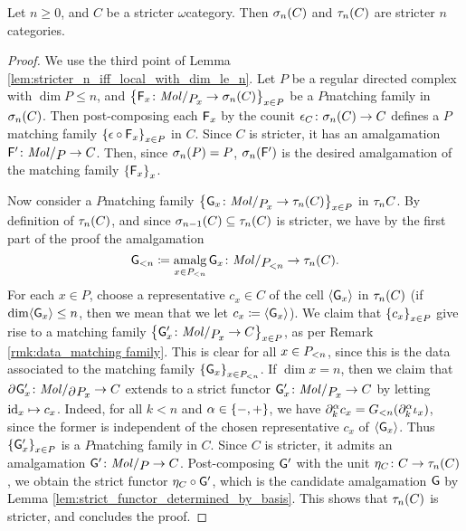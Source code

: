 \begin{lem} \label{lem:truncation_stricter_are_stricter}
    Let \( n \geq 0 \), and \( C \) be a stricter \( \omega \)\nbd category.
    Then \( \skel{n}(C) \) and \( \trunc{n}(C) \) are stricter \( n \)\nbd categories.
\end{lem}
\begin{proof}
    We use the third point of Lemma \ref{lem:stricter_n_iff_local_with_dim_le_n}.
    Let \( P \) be a regular directed complex with \( \dim P \le n \), and \( \set{\F_x \colon \molecin{\imel{P}{x}} \to \skel{n}(C)}_{x \in P} \) be a \( P \)\nbd matching family in \( \skel{n}(C) \).
    Then post-composing each \( \F_x \) by the counit \( \counit_C \colon \skel{n}(C) \to C \) defines a \( P \)\nbd matching family \( \set{\counit \after \F_x}_{x \in P} \) in \( C \).
    Since \( C \) is stricter, it has an amalgamation \( \F' \colon \molecin{P} \to C \).
    Then, since \( \skel{n}(P) = P \), \( \skel{n}(\F') \) is the desired amalgamation of the matching family \( \set{\F_x}_x \).

    Now consider a \( P \)\nbd matching family \( \set{\G_x \colon \molecin{\imel{P}{x}} \to \trunc{n}(C)}_{x \in P} \) in \( \trunc{n}C \).
    By definition of \( \trunc{n}(C) \), and since \( \skel{n - 1}(C) \subseteq \trunc{n}(C) \) is stricter, we have by the first part of the proof the amalgamation
    \begin{equation*}
        \gr{< n }{\G} \eqdef \amalg_{x \in \gr{< n}{P}} \G_x \colon \molecin{\gr{< n}{P}} \to \trunc{n}(C).
    \end{equation*}
    For each \( x \in P \), choose a representative \( c_x \in C \) of the cell \( \pcell{\G_x} \) in \( \trunc{n}(C) \) (if \( \dim \pcell{\G_x} \le n \), then we mean that we let \( c_x \eqdef \pcell{\G_x} \)).
    We claim that \( \set{c_x}_{x \in P} \) give rise to a matching family \( \set{\G'_x \colon \molecin{\imel{P}{x}} \to C}_{x \in P} \), as per Remark \ref{rmk:data_matching family}.
    This is clear for all \( x \in \gr{< n}{P} \), since this is the data associated to the matching family \( \set{\G_x}_{x \in \gr{< n}{P}} \). 
    If \( \dim x = n \), then we claim that \( \bd{}{}\G'_x \colon \molecin{\bd{}{}\imel{P}{x}} \to C \) extends to a strict functor \( \G'_x \colon \molecin{\imel{P}{x}} \to C \) by letting \( \idd{x} \mapsto c_x \).
    Indeed, for all \( k < n \) and \( \a \in \set{-, +} \), we have \( \bd{k}{\a} c_x = \gr{< n}{G}(\bd{k}{\a} \mapel{x} ) \), since the former is independent of the chosen representative \( c_x \) of \( \pcell{\G_x} \).
    Thus \( \set{\G'_x}_{x \in P} \) is a \( P \)\nbd matching family in \( C \).
    Since \( C \) is stricter, it admits an amalgamation \( \G' \colon \molecin{P} \to C \). 
    Post-composing \( \G' \) with the unit \( \unit_C \colon C \to \trunc{n}(C) \), we obtain the strict functor \( \unit_C \after \G' \), which is the candidate amalgamation \( \G \) by Lemma \ref{lem:strict_functor_determined_by_basis}.
    This shows that \( \trunc{n}(C) \) is stricter, and concludes the proof.
\end{proof}

